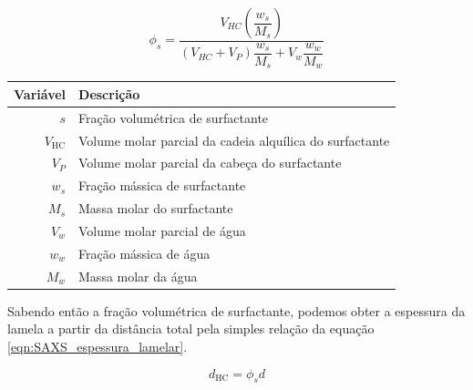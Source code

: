 		\begin{equation}
			\phi_s = \dfrac{V_{\textit{HC}}\left( \dfrac{w_{s}}{M_{s}} \right)}{\left( V_{\textit{HC}} + V_{P} \right)\dfrac{w_{s}}{M_{s}} + V_{w}\dfrac{w_{w}}{M_{w}}}
			\label{eqn:SAXS_frac_volum}
		\end{equation}
		
	
		\begin{table}[h]
			{\begin{tabular}{r l}
				\toprule
				           Variável & Descrição                                               \\ \midrule
				              \(s\) & Fração volumétrica de surfactante                       \\
				\(V_{\mathrm{HC}}\) & Volume molar parcial da cadeia alquílica do surfactante \\
				          \(V_{P}\) & Volume molar parcial da cabeça do surfactante           \\
				          \(w_{s}\) & Fração mássica de surfactante                           \\
				          \(M_{s}\) & Massa molar do surfactante                              \\ \midrule
				          \(V_{w}\) & Volume molar parcial de água                            \\
				          \(w_{w}\) & Fração mássica de água                                  \\
				          \(M_{w}\) & Massa molar da água                                     \\ \bottomrule
			\end{tabular}
			}%
			{}%
		\end{table}

		
		Sabendo então a fração volumétrica de surfactante, podemos obter a espessura da lamela a partir da distância total pela simples relação da equação \ref{eqn:SAXS_espessura_lamelar}.
		
		\begin{equation} \label{eqn:SAXS_espessura_lamelar} 
			d_{\text{HC}} = \phi_s d
		\end{equation} 
		
